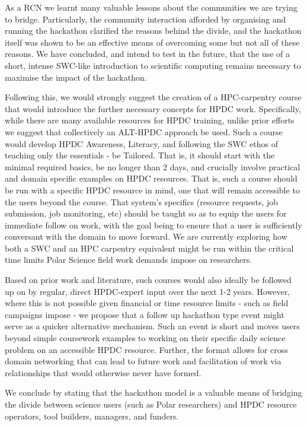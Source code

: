 \documentclass[conference]{IEEEtran}
\begin{document}
As a RCN we learnt many valuable lessons about the communities we are trying to bridge.  Particularly, the community interaction afforded by organising and running the hackathon clarified the reasons behind the divide, and the hackathon itself was shown to be an effective means of overcoming some but not all of these reasons.  We have concluded, and intend to test in the future, that the use of a short, intense SWC-like introduction to scientific computing remains necessary to maximise the impact of the hackathon.  

Following this, we would strongly suggest the creation of a HPC-carpentry course that would introduce the further necessary concepts for HPDC work.  Specifically, while there are many available resources for HPDC training, unlike prior efforts we suggest that collectively an ALT-HPDC approach be used.  Such a course would develop HPDC Awareness, Literacy, and following the SWC ethos of teaching only the essentials - be Tailored.  That is, it should start with the minimal required basics, be no longer than 2 days, and crucially involve practical and domain specific examples on HPDC resources.  That is, such a course should be run with a specific HPDC resource in mind, one that will remain accessible to the users beyond the course. That system’s specifics (resource requests, job submission, job monitoring, etc) should be taught so as to equip the users for immediate follow on work, with the goal being to ensure that a user is sufficiently conversant with the domain to move forward.  We are currently exploring how both a SWC and an HPC carpentry equivalent might be run within the critical time limits Polar Science field work demands impose on researchers.  

Based on prior work and literature, such courses would also ideally be followed up on by regular, direct HPDC-expert input over the next 1-2 years.  However, where this is not possible given financial or time resource limits - such as field campaigns impose - we propose that a follow up hackathon type event might serve as a quicker alternative mechanism. Such an event is short and moves users beyond simple coursework examples to working on their specific daily science problem on an accessible HPDC resource. Further, the format allows for cross domain networking that can lead to future work and facilitation of work via relationships that would otherwise never have formed.

We conclude by stating that the hackathon model is a valuable means of bridging the divide between science users (such as Polar researchers) and HPDC resource operators, tool builders, managers, and funders.  
\end{document}
